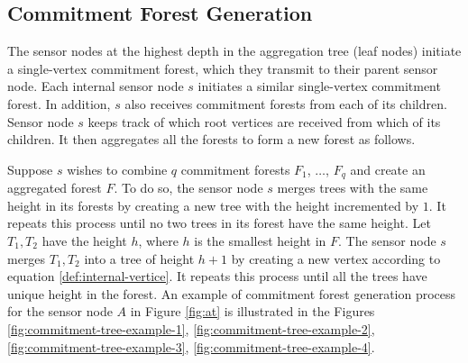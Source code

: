 	\subsection{Commitment Forest Generation}
		The sensor nodes at the highest depth in the aggregation tree (leaf nodes) initiate a single-vertex commitment forest, which they transmit to their parent sensor node.
		Each internal sensor node $s$ initiates a similar single-vertex commitment forest.
		In addition, $s$ also receives commitment forests from each of its children.
		Sensor node $s$ keeps track of which root vertices are received from which of its children.
		It then aggregates all the forests to form a new forest as follows.
		
		Suppose $s$ wishes to combine $q$ commitment forests $F_{1}$, $\dotsc$, $F_{q}$ and create an aggregated forest $F$.
		To do so, the sensor node $s$ merges trees with the same height in its forests by creating a new tree with the height incremented by $1$. 
		It repeats this process until no two trees in its forest have the same height. 
		Let $T_{1}, T_{2}$ have the height $h$, where $h$ is the smallest height in $F$.
		The sensor node $s$ merges $T_{1}, T_{2}$ into a tree of height $h + 1$ by creating a new vertex according to equation \ref{def:internal-vertice}.
		It repeats this process until all the trees have unique height in the forest.
		An example of commitment forest generation process for the sensor node $A$ in Figure \ref{fig:at} is illustrated in the Figures \ref{fig:commitment-tree-example-1}, \ref{fig:commitment-tree-example-2}, \ref{fig:commitment-tree-example-3}, \ref{fig:commitment-tree-example-4}.

